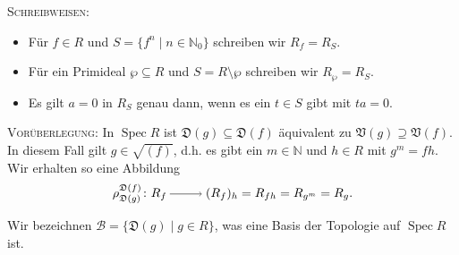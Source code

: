 \documentclass[a4paper,12pt]{scrbook}
\theoremstyle{keinenummern} %
\theoremstyle{mitnummern}
\theoremstyle{unserbeweis}
\def\V{\mathfrak{V}}
\newcommand{\D}{\mathfrak{D}}
\def\B{\mathcal{B}}
\newcommand{\Spec}{\operatorname{Spec}}
\newcommand{\set}[1]{\ensuremath{\mathbb{#1}}}
\newcommand{\N}{\set{N}}
\newcommand{\ra}{\raisebox{-1pt}{\tikz{\draw[thin,shorten >=3pt, ->] (0,0) node{\hspace*{-2pt}} -- node{} (1,0);}}\penalty1000\relax}
\begin{document}
\textsc{Schreibweisen}:
\begin{itemize}
\item Für $f\in R$ und $S=\{f^n\mid n\in\N_0\}$ schreiben wir $R_f=R_S$.
\item Für ein Primideal $\wp\subseteq R$ und $S=R\setminus\wp$ schreiben wir $R_\wp=R_S$.
\item Es gilt $a=0$ in $R_S$ genau dann, wenn es ein $t\in S$ gibt mit $ta=0$.
\end{itemize}

\textsc{Vorüberlegung}: In $\Spec R$ ist $\D(g)\subseteq \D(f)$ äquivalent zu $\V(g)\supseteq\V(f)$. In diesem Fall gilt
$g\in\sqrt{(f)}$, d.h. es gibt ein $m\in\N$ und $h\in R$ mit $g^m=fh$. Wir erhalten so eine Abbildung
\[ \rho_{\D(g)}^{\D(f)}\colon R_f\ra (R_f)_h=R_{fh}=R_{g^m}=R_g. \]

Wir bezeichnen $\B=\{\D(g)\mid g\in R\}$, was eine Basis der Topologie auf $\Spec R$ ist.
\end{document}
